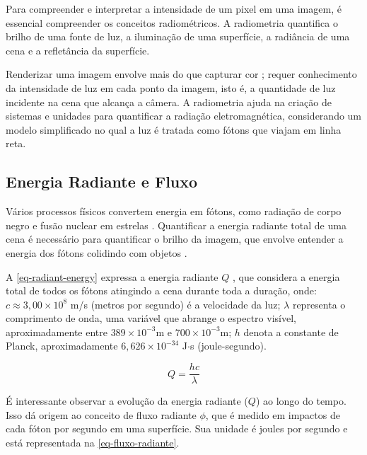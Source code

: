 \documentclass[english,
               brazil,
               bsc] %
               {dcomp-abntex2}
\begin{document}
Para compreender e interpretar a intensidade de um pixel em uma imagem, é essencial compreender os conceitos radiométricos. A radiometria quantifica o brilho de uma fonte de luz, a iluminação de uma superfície, a radiância de uma cena e a refletância da superfície.


Renderizar uma imagem envolve mais do que capturar cor \cite{radiometry_color}; requer conhecimento da intensidade de luz em cada ponto da imagem, isto é, a quantidade de luz incidente na cena que alcança a câmera. A radiometria ajuda na criação de sistemas e unidades para quantificar a radiação eletromagnética, considerando um modelo simplificado no qual a luz é tratada como fótons que viajam em linha reta. 


\subsection{Energia Radiante e Fluxo} \label{fluxo}


Vários processos físicos convertem energia em fótons, como radiação de corpo negro e fusão nuclear em estrelas \cite{black_body_radiation}. Quantificar a energia radiante total de uma cena é necessário para quantificar o brilho da imagem, que envolve entender a energia dos fótons colidindo com objetos \cite{rendering_judice}.


A \autoref{eq-radiant-energy} expressa a energia radiante \( Q \) \cite{pbr}, que considera a energia total de todos os fótons atingindo a cena durante toda a duração, onde:  \( c  \approx 3,00 \times 10^8 \) m/s (metros por segundo) é a velocidade da luz; \( \lambda \) representa o comprimento de onda, uma variável que abrange o espectro visível, aproximadamente entre \( 389 \times 10^{-3} \)m e \(700 \times 10^{-3} \)m; \( h \) denota a constante de Planck, aproximadamente \( 6,626 \times 10^{-34} \) J$\cdot$s (joule-segundo).




\begin{equation}\label{eq-radiant-energy}
Q = \frac{hc}{\lambda}
\end{equation}






É interessante observar a evolução da energia radiante ($Q$) ao longo do tempo. Isso dá origem ao conceito de fluxo radiante $\phi$, que é medido em impactos de cada fóton por segundo em uma superfície. Sua unidade é joules por segundo e está representada na \autoref{eq-fluxo-radiante}.
\end{document}
